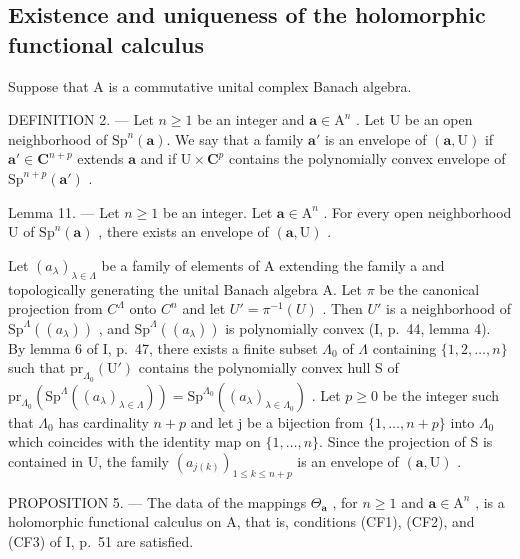 \subsection{Existence and uniqueness of the holomorphic functional calculus}

Suppose that A is a commutative unital complex Banach algebra.

DEFINITION 2. --- Let \(n \geqslant 1\) be an integer and \(\boldsymbol{a} \in \mathrm{A}^{n}\) . Let U be an open neighborhood of \(\mathrm{Sp}^{n}(\boldsymbol{a})\). We say that a family \(\boldsymbol{a}'\) is an envelope of \((\boldsymbol{a}, \mathrm{U})\) if \(\boldsymbol{a}' \in \mathbf{C}^{n+p}\) extends \(\boldsymbol{a}\) and if \(\mathrm{U} \times \mathbf{C}^{p}\) contains the polynomially convex envelope of \(\mathrm{Sp}^{n+p}(\boldsymbol{a}')\) .

Lemma 11. --- Let \(n \geqslant 1\) be an integer. Let \(\boldsymbol{a} \in \mathrm{A}^{n}\) . For every open neighborhood U of \(\mathrm{Sp}^{n}(\boldsymbol{a})\) , there exists an envelope of \((\boldsymbol{a}, \mathrm{U})\) .

Let \((a_{\lambda})_{\lambda\in\Lambda}\) be a family of elements of A extending the family a and topologically generating the unital Banach algebra A. Let \(\pi\) be the canonical projection from \(C^{\Lambda}\) onto \(C^{n}\) and let \(U'=\pi^{-1}(U)\) . Then \(U'\) is a neighborhood of \(\mathrm{Sp}^{\Lambda}((a_{\lambda}))\) , and \(\mathrm{Sp}^{\Lambda}((a_{\lambda}))\) is polynomially convex (I, p.~44, lemma 4). By lemma 6 of I, p.~47, there exists a finite subset \(\Lambda_{0}\) of \(\Lambda\) containing \(\{1,2,\ldots,n\}\) such that \(\mathrm{pr}_{\Lambda_{0}}(\mathrm{U}')\) contains the polynomially convex hull S of \(\mathrm{pr}_{\Lambda_{0}}(\mathrm{Sp}^{\Lambda}((a_{\lambda})_{\lambda\in\Lambda}))=\mathrm{Sp}^{\Lambda_{0}}((a_{\lambda})_{\lambda\in\Lambda_{0}})\) . Let \(p\geqslant0\) be the integer such that \(\Lambda_{0}\) has cardinality \(n+p\) and let j be a bijection from \(\{1,\ldots,n+p\}\) into \(\Lambda_{0}\) which coincides with the identity map on \(\{1,\ldots,n\}\). Since the projection of S is contained in U, the family \((a_{j(k)})_{1\leqslant k\leqslant n+p}\) is an envelope of \((\boldsymbol{a},\mathrm{U})\) .

PROPOSITION 5. --- The data of the mappings \(\Theta_{\boldsymbol{a}}\) , for \(n \geqslant 1\) and \(\boldsymbol{a} \in \mathrm{A}^{n}\) , is a holomorphic functional calculus on A, that is, conditions (CF1), (CF2), and (CF3) of I, p.~51 are satisfied.

